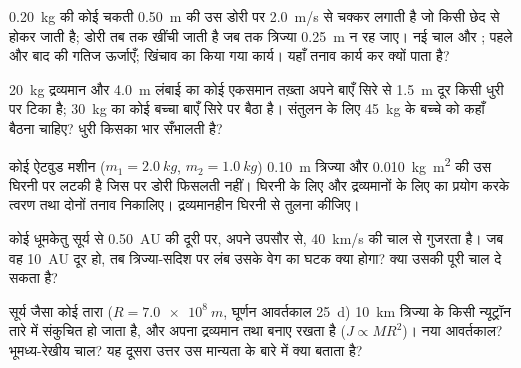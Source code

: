 \begin{exercise}[$\star\star$]\label{exo:b1:angular-momentum:7}
\qty{0.20}{kg} की कोई चकती \qty{0.50}{m} की उस डोरी पर \qty{2.0}{m/s} से
चक्कर लगाती है जो किसी छेद से होकर जाती है; डोरी तब तक खींची जाती है जब तक
त्रिज्या \qty{0.25}{m} न रह जाए। नई चाल और ; पहले और बाद की गतिज
ऊर्जाएँ; खिंचाव का किया गया कार्य। यहाँ तनाव कार्य कर क्यों पाता है?
\end{exercise}

\begin{exercise}[$\star\star$]\label{exo:b1:angular-momentum:8}
\qty{20}{kg} द्रव्यमान और \qty{4.0}{m} लंबाई का कोई एकसमान तख़्ता अपने बाएँ
सिरे से \qty{1.5}{m} दूर किसी धुरी पर टिका है; \qty{30}{kg} का कोई बच्चा
बाएँ सिरे पर बैठा है। संतुलन के लिए \qty{45}{kg} के बच्चे को कहाँ बैठना
चाहिए? धुरी किसका भार सँभालती है?
\end{exercise}

\begin{exercise}[$\star\star$]\label{exo:b1:angular-momentum:9}
कोई ऐटवुड मशीन ($m_1 = \qty{2.0}{kg}$, $m_2 = \qty{1.0}{kg}$) \qty{0.10}{m}
त्रिज्या और \qty{0.010}{kg.m^2}  की उस घिरनी पर लटकी है जिस पर
डोरी फिसलती नहीं। घिरनी के लिए  और द्रव्यमानों के लिए
 का प्रयोग करके त्वरण तथा दोनों तनाव निकालिए। द्रव्यमानहीन
घिरनी से तुलना कीजिए।
\end{exercise}

\begin{exercise}[$\star\star\star$]\label{exo:b1:angular-momentum:10}
कोई धूमकेतु सूर्य से \qty{0.50}{AU} की दूरी पर, अपने उपसौर से,
\qty{40}{km/s} की चाल से गुजरता है। जब वह \qty{10}{AU} दूर हो, तब
त्रिज्या-सदिश पर लंब उसके वेग का घटक क्या होगा? क्या 
उसकी पूरी चाल दे सकता है?
\end{exercise}

\begin{exercise}[$\star\star\star$]\label{exo:b1:angular-momentum:11}
सूर्य जैसा कोई तारा ($R = \qty{7.0e8}{m}$, घूर्णन आवर्तकाल \qty{25}{d})
\qty{10}{km} त्रिज्या के किसी न्यूट्रॉन तारे में संकुचित हो जाता है, और
अपना द्रव्यमान तथा  बनाए रखता है ($J \propto MR^2$)। नया
आवर्तकाल? भूमध्य-रेखीय चाल? यह दूसरा उत्तर उस मान्यता के बारे में क्या
बताता है?
\end{exercise}

